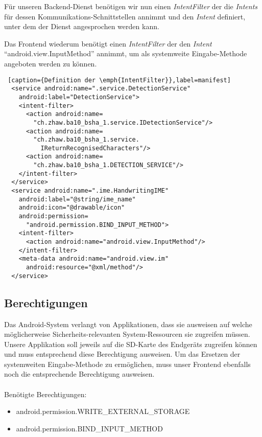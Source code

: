 Für unseren Backend-Dienst benötigen wir nun einen \emph{IntentFilter} der die \emph{Intents} für dessen Kommunikations-Schnittstellen annimmt und den \emph{Intent} definiert, unter dem der Dienst angesprochen werden kann.

Das Frontend wiederum benötigt einen \emph{IntentFilter} der den \emph{Intent} ``android.view.InputMethod'' annimmt, um als systemweite Eingabe-Methode angeboten werden zu können.

\begin{lstlisting} [caption={Definition der \emph{IntentFilter}},label=manifest]
  <service android:name=".service.DetectionService" 
    android:label="DetectionService">
    <intent-filter>
      <action android:name=
        "ch.zhaw.ba10_bsha_1.service.IDetectionService"/>
      <action android:name=
        "ch.zhaw.ba10_bsha_1.service.
          IReturnRecognisedCharacters"/>
      <action android:name=
        "ch.zhaw.ba10_bsha_1.DETECTION_SERVICE"/>
    </intent-filter>
  </service>
  <service android:name=".ime.HandwritingIME"
    android:label="@string/ime_name" 
    android:icon="@drawable/icon" 
    android:permission=
      "android.permission.BIND_INPUT_METHOD">
    <intent-filter>
      <action android:name="android.view.InputMethod"/>
    </intent-filter>
    <meta-data android:name="android.view.im" 
      android:resource="@xml/method"/>
  </service>
\end{lstlisting}

\subsection{Berechtigungen}

Das Android-System verlangt von Applikationen, dass sie ausweisen auf welche möglicherweise Sicherheits-relevanten System-Ressourcen sie zugreifen müssen. Unsere Applikation soll jeweils auf die SD-Karte des Endgeräts zugreifen können und muss entsprechend diese Berechtigung ausweisen. Um das Ersetzen der systemweiten Eingabe-Methode zu ermöglichen, muss unser Frontend ebenfalls noch die entsprechende Berechtigung ausweisen.\\
\\
Benötigte Berechtigungen:
\begin{itemize}
  \item android.permission.WRITE\_EXTERNAL\_STORAGE
  \item android.permission.BIND\_INPUT\_METHOD
\end{itemize}

